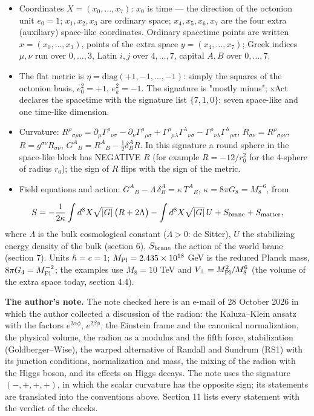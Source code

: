 \documentclass[10pt,a4paper]{article}
\begin{document}
\begin{itemize}
\item Coordinates $X=(x_0,\dots,x_7)$: $x_0$ is time — the direction of the octonion unit $e_0=1$; $x_1,x_2,x_3$ are ordinary space; $x_4,x_5,x_6,x_7$ are the four extra (auxiliary) space-like coordinates. Ordinary spacetime points are written $x=(x_0,\dots,x_3)$, points of the extra space $y=(x_4,\dots,x_7)$; Greek indices $\mu,\nu$ run over $0,\dots,3$, Latin $i,j$ over $4,\dots,7$, capital $A,B$ over $0,\dots,7$.
\item The flat metric is $\eta=\mathrm{diag}(+1,-1,\dots,-1)$: simply the squares of the octonion basis, $e_0^2=+1$, $e_k^2=-1$. The signature is "mostly minus"; xAct declares the spacetime with the signature list $\{7,1,0\}$: seven space-like and one time-like dimension.
\item Curvature: $R^\rho{}_{\sigma\mu\nu}=\partial_\mu\Gamma^\rho{}_{\nu\sigma}-\partial_\nu\Gamma^\rho{}_{\mu\sigma}+\Gamma^\rho{}_{\mu\lambda}\Gamma^\lambda{}_{\nu\sigma}-\Gamma^\rho{}_{\nu\lambda}\Gamma^\lambda{}_{\mu\sigma}$, $R_{\sigma\nu}=R^\rho{}_{\sigma\rho\nu}$, $R=g^{\sigma\nu}R_{\sigma\nu}$, $G^A{}_B=R^A{}_B-\frac12\delta^A_BR$. In this signature a round sphere in the space-like block has NEGATIVE $R$ (for example $R=-12/r_0^2$ for the 4-sphere of radius $r_0$); the sign of $R$ flips with the sign of the metric.
\item Field equations and action: $G^A{}_B-\Lambda\,\delta^A_B=\kappa\,T^A{}_B$, $\kappa=8\pi G_8=M_8^{-6}$, from
\end{itemize}
\begin{equation*}
S=-\frac1{2\kappa}\int d^8X\sqrt{|G|}\,\big(R+2\Lambda\big)-\int d^8X\sqrt{|G|}\,U+S_{\rm brane}+S_{\rm matter},
\end{equation*}
where $\Lambda$ is the bulk cosmological constant ($\Lambda>0$: de Sitter), $U$ the stabilizing energy density of the bulk (section 6), $S_{\rm brane}$ the action of the world brane (section 7). Units $\hbar=c=1$; $M_{\rm Pl}=2.435\times10^{18}$ GeV is the reduced Planck mass, $8\pi G_4=M_{\rm Pl}^{-2}$; the examples use $M_8=10$ TeV and $V_\perp=M_{\rm Pl}^2/M_8^6$ (the volume of the extra space today, section 4.4).

\textbf{The author’s note.} The note checked here is an e-mail of 28 October 2026 in which the author collected a discussion of the radion: the Kaluza–Klein ansatz with the factors $e^{2\alpha\phi}$, $e^{2\beta\phi}$, the Einstein frame and the canonical normalization, the physical volume, the radion as a modulus and the fifth force, stabilization (Goldberger–Wise), the warped alternative of Randall and Sundrum (RS1) with its junction conditions, normalization and mass, the mixing of the radion with the Higgs boson, and its effects on Higgs decays. The note uses the signature $(-,+,+,+)$, in which the scalar curvature has the opposite sign; its statements are translated into the conventions above. Section 11 lists every statement with the verdict of the checks.
\end{document}
